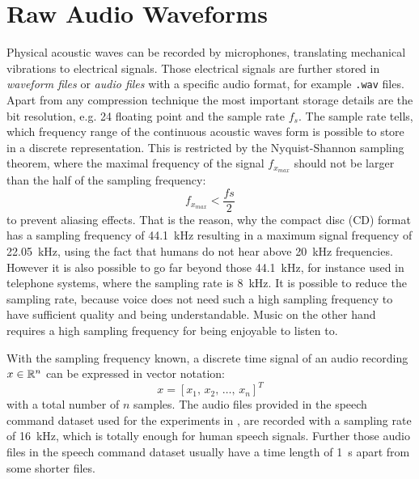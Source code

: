 
\section{Raw Audio Waveforms}\label{sec:raw_audio}\label{sec:signal_raw}
\thesisStateReady
Physical acoustic waves can be recorded by microphones, translating mechanical vibrations to electrical signals. 
Those electrical signals are further stored in \emph{waveform files} or \emph{audio files} with a specific audio format, for example \texttt{.wav} files.
Apart from any compression technique the most important storage details are the bit resolution, e.g. \SI{24}{\bit} floating point and the sample rate $f_s$. 
The sample rate tells, which frequency range of the continuous acoustic waves form is possible to store in a discrete representation.
This is restricted by the Nyquist-Shannon sampling theorem, where the maximal frequency of the signal $f_{x_{max}}$ should not be larger than the half of the sampling frequency: 
\begin{equation}\label{eq:signal_raw_nyquist}
  f_{x_{max}} < \frac{fs}{2}
\end{equation}
to prevent aliasing effects.
That is the reason, why the compact disc (CD) format has a sampling frequency of \SI{44.1}{\kilo\hertz} resulting in a maximum signal frequency of \SI{22.05}{\kilo\hertz}, using the fact that humans do not hear above \SI{20}{\kilo\hertz} frequencies.
However it is also possible to go far beyond those \SI{44.1}{\kilo\hertz}, for instance used in telephone systems, where the sampling rate is \SI{8}{\kilo\hertz}.
It is possible to reduce the sampling rate, because voice does not need such a high sampling frequency to have sufficient quality and being understandable.
Music on the other hand requires a high sampling frequency for being enjoyable to listen to.

With the sampling frequency known, a discrete time signal of an audio recording $x \in \mathbb{R}^n$ can be expressed in vector notation:
\begin{equation}\label{eq:signal_raw_x}
  x = [x_1,\, x_2,\, \dots,\, x_n]^T
\end{equation}
with a total number of $n$ samples.
The audio files provided in the speech command dataset \cite{Warden2018} used for the experiments in , are recorded with a sampling rate of \SI{16}{\kilo\hertz}, which is totally enough for human speech signals.
Further those audio files in the speech command dataset usually have a time length of \SI{1}{\second} apart from some shorter files.

